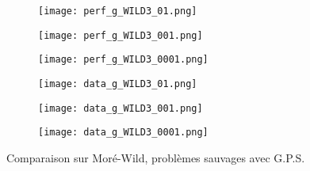 \documentclass[letterpaper]{scrartcl}
\begin{document}
\begin{figure}[!htb] %
	\begin{subfigure}{0.48\textwidth}
		\texttt{[image: perf\_g\_WILD3\_01.png]}
	\end{subfigure}\hspace*{\fill}
	\begin{subfigure}{0.48\textwidth}
		\texttt{[image: perf\_g\_WILD3\_001.png]}
	\end{subfigure}
	\medskip
	\begin{subfigure}{0.48\textwidth}
		\texttt{[image: perf\_g\_WILD3\_0001.png]}
	\end{subfigure}\hspace*{\fill}
	\begin{subfigure}{0.48\textwidth}
		\texttt{[image: data\_g\_WILD3\_01.png]}
	\end{subfigure}
	\medskip
	\begin{subfigure}{0.48\textwidth}
		\texttt{[image: data\_g\_WILD3\_001.png]}
	\end{subfigure}\hspace*{\fill}
	\begin{subfigure}{0.48\textwidth}
		\texttt{[image: data\_g\_WILD3\_0001.png]}
	\end{subfigure}
	\caption{Comparaison sur Moré-Wild, problèmes sauvages avec G.P.S.} \label{fig:8}
\end{figure}
\clearpage
\end{document}
